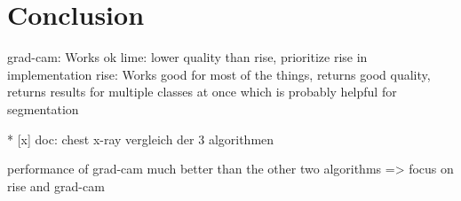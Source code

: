 \section{Conclusion}
grad-cam: Works ok
lime: lower quality than rise, prioritize rise in implementation
rise: Works good for most of the things, returns good quality, returns results for multiple classes at once which is probably helpful for segmentation

* [x] doc: chest x-ray vergleich der 3 algorithmen


performance of grad-cam much better than the other two algorithms
=> focus on rise and grad-cam